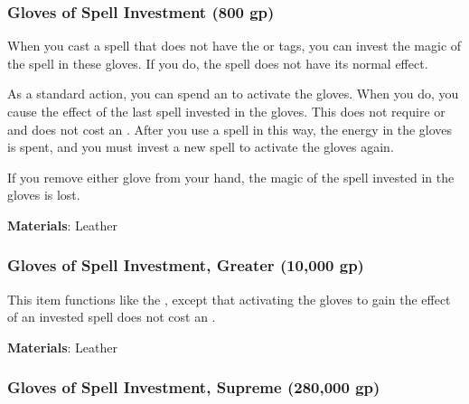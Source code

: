 \lowercase{\hypertarget{item:Gloves of Spell Investment}{}}\label{item:Gloves of Spell Investment}
\hypertarget{item:Gloves of Spell Investment}{\subsubsection{Gloves of Spell Investment\hfill{} (800 gp)}}

When you cast a spell that does not have the  or  tags,
you can invest the magic of the spell in these gloves.
If you do, the spell does not have its normal effect.

As a standard action, you can spend an  to activate the gloves.
When you do, you cause the effect of the last spell invested in the gloves.
This does not require  or  and does not cost an .
After you use a spell in this way, the energy in the gloves is spent, and you must invest a new spell to activate the gloves again.

If you remove either glove from your hand, the magic of the spell invested in the gloves is lost.



\vspace{0.25em}
\textbf{Materials}: Leather


\lowercase{\hypertarget{item:Gloves of Spell Investment, Greater}{}}\label{item:Gloves of Spell Investment, Greater}
\hypertarget{item:Gloves of Spell Investment, Greater}{\subsubsection{Gloves of Spell Investment, Greater\hfill{} (10,000 gp)}}

This item functions like the , except that
activating the gloves to gain the effect of an invested spell does not cost an .



\vspace{0.25em}
\textbf{Materials}: Leather


\lowercase{\hypertarget{item:Gloves of Spell Investment, Supreme}{}}\label{item:Gloves of Spell Investment, Supreme}
\hypertarget{item:Gloves of Spell Investment, Supreme}{\subsubsection{Gloves of Spell Investment, Supreme\hfill{} (280,000 gp)}}

